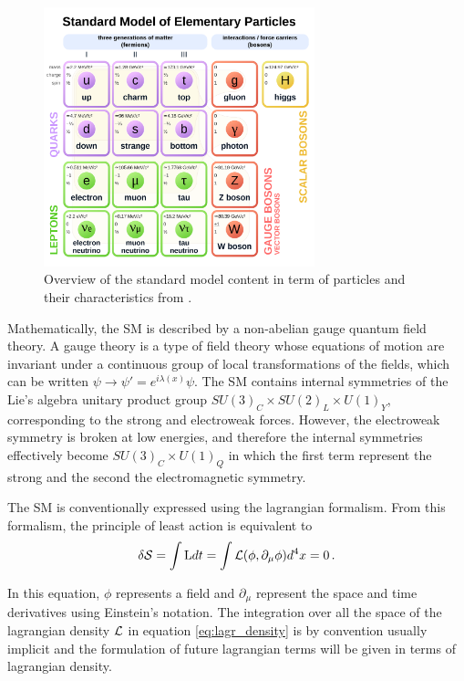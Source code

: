 \begin{figure}
    \centering
    \includegraphics[width=0.7\textwidth]{Images/SM_zoo.png}
    \caption{Overview of the standard model content in term of particles and their characteristics from \cite{SMschema}.}
    \label{fig:SM}
\end{figure}

Mathematically, the SM is described by a non-abelian gauge quantum field theory. A gauge theory is a type of field theory whose equations of motion are invariant under a continuous group of local transformations of the fields, which can be written $\psi \rightarrow \psi' = e^{i\lambda(x)}\psi$. The SM contains internal symmetries of the Lie's algebra unitary product group $SU(3)_C \times SU(2)_L \times U(1)_Y$, corresponding to the strong and electroweak forces. However, the electroweak symmetry is broken at low energies, and therefore the internal symmetries effectively become $SU(3)_C \times U(1)_Q$ in which the first term represent the strong and the second the electromagnetic symmetry.

The SM is conventionally expressed using the lagrangian formalism. From this formalism, the principle of least action is equivalent to \cite{Thomson:2013zua}
\begin{equation}
    \delta \mathcal{S} = \int \mathrm{L} dt = \int \Lagr(\phi,\partial_{\mu}\phi) d^4 x = 0 \mend
    \label{eq:lagr_density}
\end{equation}

In this equation, $\phi$ represents a field and $\partial_{\mu}$ represent the space and time derivatives using Einstein's notation. The integration over all the space of the lagrangian density $\mathcal{L}$ in equation \ref{eq:lagr_density} is by convention usually implicit and the formulation of future lagrangian terms will be given in terms of lagrangian density.\newline

